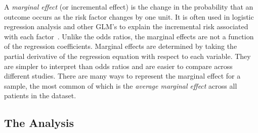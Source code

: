 A \emph{marginal effect} (or incremental effect) is the change in the probability that an outcome occurs as the risk factor changes by one unit.
It is often used in logistic regression analysis and other GLM's to explain the incremental risk associated with each factor~\citep{Marginal-Effects--Quantifying-the-Effect-of-Changes-in-Risk-Factors-in-Logistic-Regression-Models}. 
Unlike the odds ratios, the marginal effects are not a function of the regression coefficients.
Marginal effects are determined by taking the partial derivative of the regression equation with respect to each variable.
They are simpler to interpret than odds ratios and are easier to compare across different studies.
There are many ways to represent the marginal effect for a sample, the most common of which is the \emph{average marginal effect} across all patients in the dataset.

\subsection{The Analysis}\label{subsec:analysis}

